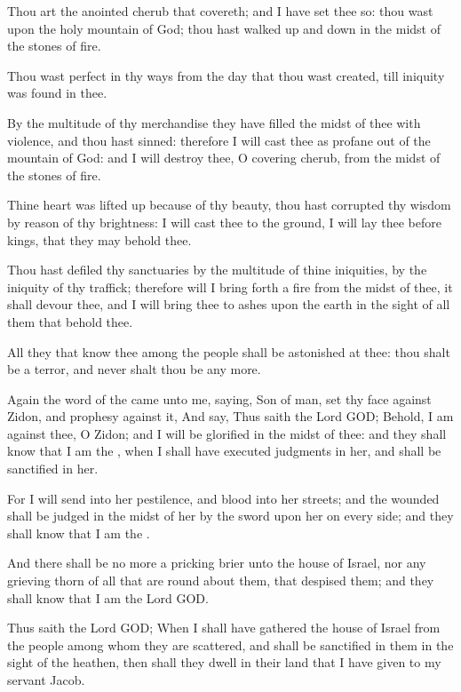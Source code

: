 \Verse Thou art the anointed cherub that covereth; and I have set thee so: thou wast upon the holy mountain of God; thou hast walked up and down in the midst of the stones of fire.

\Verse Thou wast perfect in thy ways from the day that thou wast created, till iniquity was found in thee.

\Verse By the multitude of thy merchandise they have filled the midst of thee with violence, and thou hast sinned: therefore I will cast thee as profane out of the mountain of God: and I will destroy thee, O covering cherub, from the midst of the stones of fire.

\Verse Thine heart was lifted up because of thy beauty, thou hast corrupted thy wisdom by reason of thy brightness: I will cast thee to the ground, I will lay thee before kings, that they may behold thee.

\Verse Thou hast defiled thy sanctuaries by the multitude of thine iniquities, by the iniquity of thy traffick; therefore will I bring forth a fire from the midst of thee, it shall devour thee, and I will bring thee to ashes upon the earth in the sight of all them that behold thee.

\Verse All they that know thee among the people shall be astonished at thee: thou shalt be a terror, and never shalt thou be any more.

\Verse Again the word of the \LORD came unto me, saying, \Verse Son of man, set thy face against Zidon, and prophesy against it, \Verse And say, Thus saith the Lord GOD; Behold, I am against thee, O Zidon; and I will be glorified in the midst of thee: and they shall know that I am the \LORD, when I shall have executed judgments in her, and shall be sanctified in her.

\Verse For I will send into her pestilence, and blood into her streets; and the wounded shall be judged in the midst of her by the sword upon her on every side; and they shall know that I am the \LORD.

\Verse And there shall be no more a pricking brier unto the house of Israel, nor any grieving thorn of all that are round about them, that despised them; and they shall know that I am the Lord GOD.

\Verse Thus saith the Lord GOD; When I shall have gathered the house of Israel from the people among whom they are scattered, and shall be sanctified in them in the sight of the heathen, then shall they dwell in their land that I have given to my servant Jacob.

